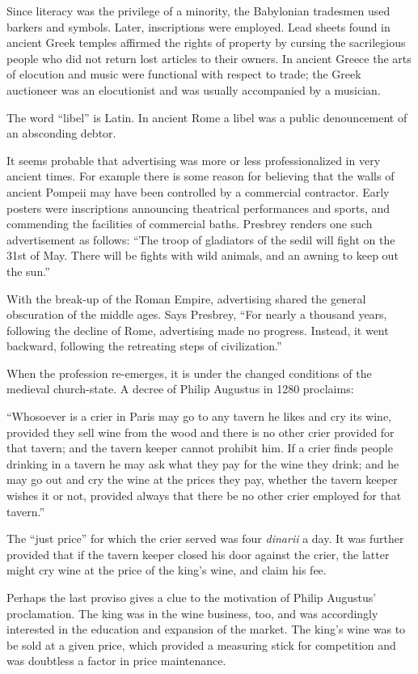 \documentclass[twoside,nohyper,openany,nobib]{tufte-book}
\begin{document}
Since literacy was the privilege of a minority, the Babylonian tradesmen
used barkers and symbols. Later, inscriptions were employed. Lead sheets
found in ancient Greek temples affirmed the rights of property by
cursing the sacrilegious people who did not return lost articles to
their owners. In ancient Greece the arts of elocution and music were
functional with respect to trade; the Greek auctioneer was an
elocutionist and was usually accompanied by a musician.

The word ``libel'' is Latin. In ancient Rome a libel was a public
denouncement of an absconding debtor.

It seems probable that advertising was more or less professionalized in
very ancient times. For example there is some reason for believing that
the walls of ancient Pompeii may have been controlled by a commercial
contractor. Early posters were inscriptions announcing theatrical
performances and sports, and commending the facilities of commercial
baths. Presbrey renders one such advertisement as follows: ``The troop
of gladiators of the sedil will fight on the 31st of May. There will be
fights with wild animals, and an awning to keep out the sun.''

With the break-up of the Roman Empire, advertising shared the general
obscuration of the middle ages. Says Presbrey, ``For nearly a thousand
years, following the decline of Rome, advertising made no progress.
Instead, it went backward, following the retreating steps of
civilization.''

When the profession re-emerges, it is under the changed conditions of
the medieval church-state. A decree of Philip Augustus in 1280
proclaims:

``Whosoever is a crier in Paris may go to any tavern he likes and cry
its wine, provided they sell wine from the wood and there is no other
crier provided for that tavern; and the tavern keeper cannot prohibit
him. If a crier finds people drinking in a tavern he may ask what they
pay for the wine they drink; and he may go out and cry the wine at the
prices they pay, whether the tavern keeper wishes it or not, provided
always that there be no other crier employed for that tavern.''

The ``just price'' for which the crier served was four \emph{dinarii} a
day. It was further provided that if the tavern keeper closed his door
against the crier, the latter might cry wine at the price of the king's
wine, and claim his fee.

Perhaps the last proviso gives a clue to the motivation of Philip
Augustus' proclamation. The king was in the wine business, too, and was
accordingly interested in the education and expansion of the market. The
king's wine was to be sold at a given price, which provided a measuring
stick for competition and was doubtless a factor in price maintenance.
\end{document}
